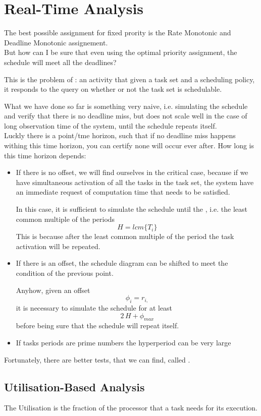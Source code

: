 \chapter{Real-Time Analysis}

The best possible assignment for fixed prority is the Rate Monotonic and Deadline Monotonic assignement.\\
But how can I be sure that even using the optimal priority assignment, the schedule will meet all the deadlines?

This is the problem of : an activity that given a task set  and a scheduling policy, it responds to the query on whether or not the task set is schedulable.

What we have done so far is something very naive, i.e. simulating the schedule and verify that there is no deadline miss, but does not scale well in the case of long observation time of the system, until the schedule repeats itself. \\
Luckly there is a point/tme horizon, such that if no deadline miss happens withing this time horizon, you can certify none will occur ever after. How long is this time horizon depends:
\begin{itemize}
\item If there is no offset, we will find ourselves in the critical case, because if we have simultaneous activation of all the tasks in the task set, the system have an immediate request of computation time that needs to be satisfied.

In this case, it is sufficient  to simulate the schedule until the , i.e. the least common multiple of the periods
\[H = lcm\{T_i\}\]
This is because after the least common multiple of the period the task activation will be repeated.
\item If there is an offset, the schedule diagram can be shifted to meet the condition of the previous point.

Anyhow, given an offset
\[\phi_i = r_{i,}\]
it is necessary to simulate the schedule for at least 
\[2\,H + \phi_{max}\]
before being sure that the schedule will repeat itself.
\item If tasks periods are prime numbers the hyperperiod can be very large
\end{itemize}

Fortunately, there are better tests, that we can find, called .

\section{Utilisation-Based Analysis}
The Utilisation is the fraction of the processor that a task needs for its execution.

